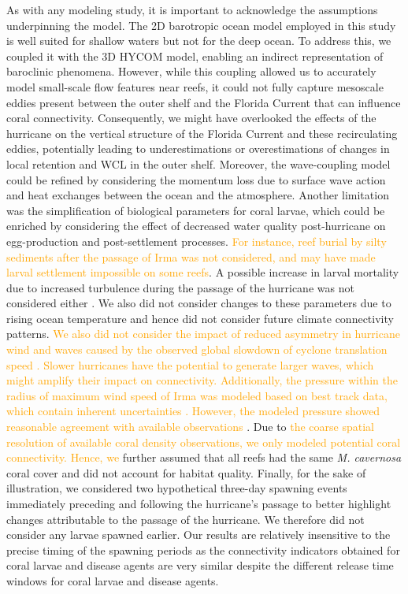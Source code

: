 \documentclass[fleqn,10pt]{wlscirep}
\newcommand{\modif}[1]{\textcolor{orange}{#1}}
\begin{document}
As with any modeling study, it is important to acknowledge the assumptions underpinning the model. The 2D barotropic ocean model employed in this study is well suited for shallow waters but not for the deep ocean. To address this, we coupled it with the 3D HYCOM model, enabling an indirect representation of baroclinic phenomena. However, while this coupling allowed us to accurately model small-scale flow features near reefs, it could not fully capture mesoscale eddies present between the outer shelf and the Florida Current that can influence coral connectivity. Consequently, we might have overlooked the effects of the hurricane on the vertical structure of the Florida Current \citep{ezer2018interaction} and these recirculating eddies, potentially leading to underestimations or overestimations of changes in local retention and WCL in the outer shelf. Moreover, the wave-coupling model could be refined by considering the momentum loss due to surface wave action and heat exchanges between the ocean and the atmosphere. Another limitation was the simplification of biological parameters for coral larvae, which could be enriched by considering the effect of decreased water quality post-hurricane on egg-production and post-settlement processes. \modif{For instance, reef burial by silty sediments after the passage of Irma was not considered, and may have made larval settlement impossible on some reefs}. A possible increase in larval mortality due to increased turbulence during the passage of the hurricane was not considered either \citep{heyward2012}. We also did not consider changes to these parameters due to rising ocean temperature and hence did not consider future climate connectivity patterns. \modif{We also did not consider the impact of reduced asymmetry in hurricane wind and waves caused by the observed global slowdown of cyclone translation speed \citep{kossin2018global}. Slower hurricanes have the potential to generate larger waves, which might amplify their impact on connectivity. Additionally, the pressure within the radius of maximum wind speed of Irma was modeled based on best track data, which contain inherent uncertainties \citep{torn2012uncertainty}. However, the modeled pressure showed reasonable agreement with available observations \citep{DobbyIrma}}. Due to \modif{the coarse spatial resolution of available coral density observations, we only modeled potential coral connectivity. Hence, we} further assumed that all reefs had the same \emph{M. cavernosa} coral cover and did not account for habitat quality. Finally, for the sake of illustration, we considered two hypothetical three-day spawning events immediately preceding and following the hurricane's passage to better highlight changes attributable to the passage of the hurricane. We therefore did not consider any larvae spawned earlier. Our results are relatively insensitive to the precise timing of the spawning periods as the connectivity indicators obtained for coral larvae and disease agents are very similar despite the different release time windows for coral larvae and disease agents.
\end{document}

